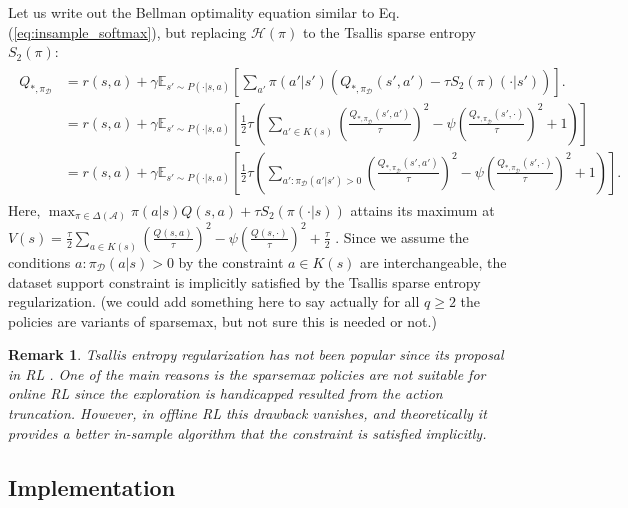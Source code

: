 \documentclass{article}
\newtheorem*{remark}{Remark}
\newcommand{\AdaBracket}[1]{\left(#1\right)}
\newcommand{\AdaRectBracket}[1]{\left[#1\right]}
\newcommand{\expectation}[2]{\mathbb{E}_{#1}\AdaRectBracket{#2}}
\newcommand{\entropy}{\mathcal{H}\left( \pi \right)}
\newcommand{\eq}[1]{Eq.\,(#1)}
\newcommand{\datasetOptimalQ}{Q_{*, \pi_{\mathcal{D}}}}
\newcommand{\datasetPolicy}{\pi_{\mathcal{D}}}
\begin{document}
Let us write out the Bellman optimality equation similar to \eq{\ref{eq:insample_softmax}}, but replacing $\entropy$ to the Tsallis sparse entropy $S_2(\pi)$:
\begin{align}
    \begin{split}
    \datasetOptimalQ &= r(s,a) +  \gamma \expectation{s'\sim P(\cdot | s,a)}{ \sum_{a'} \pi(a'|s') \AdaBracket{\datasetOptimalQ(s',a') - \tau S_2(\pi)(\cdot|s')}}. \\ 
    &= r(s,a) +  \gamma \expectation{s'\sim P(\cdot | s,a)}{ \frac{1}{2}\tau \AdaBracket{ \sum_{a' \in K(s)} \AdaBracket{\frac{\datasetOptimalQ(s',a')}{\tau}}^2 - \psi \AdaBracket{\frac{\datasetOptimalQ(s', \cdot)}{\tau}}^2 + 1 }}\\
    &= r(s,a) +  \gamma \expectation{s'\sim P(\cdot | s,a)}{ \frac{1}{2}\tau \AdaBracket{ \sum_{a': \datasetPolicy(a'|s') > 0} \AdaBracket{\frac{\datasetOptimalQ(s',a')}{\tau}}^2 - \psi \AdaBracket{\frac{\datasetOptimalQ(s', \cdot)}{\tau}}^2 + 1 }}.
    \label{eq:insample_sparsemax}
    \end{split}
\end{align}
Here, $\max_{\pi \in \Delta(\mathcal{A})}\pi(a|s)Q(s,a) + \tau S_2(\pi(\cdot|s)) $ attains its maximum at $V(s) = \frac{\tau}{2} \sum_{a \in K(s)}\AdaBracket{ \frac{Q(s,a)}{\tau} }^2 - \psi\AdaBracket{\frac{Q(s, \cdot)}{\tau}}^2 + \frac{\tau}{2}$ \cite{Lee2018-TsallisRAL,Martins16-sparsemax}.
Since we assume the conditions $a:\datasetPolicy(a|s) > 0$ by the constraint $a\in K(s)$ are interchangeable, the dataset support constraint is implicitly satisfied by the Tsallis sparse entropy regularization.
{\color{red}(we could add something here to say actually for all $q\geq 2$ the policies are variants of sparsemax, but not sure this is needed or not.)}


\begin{remark}
    Tsallis entropy regularization has not been popular since its proposal in RL \cite{Lee2018-TsallisRAL}.
    One of the main reasons is the sparsemax policies are not suitable for online RL since the exploration is handicapped resulted from the action truncation.
    However, in offline RL this drawback vanishes, and theoretically it provides a better in-sample algorithm that the constraint is satisfied implicitly. 
\end{remark}


\subsection{Implementation}
\end{document}
